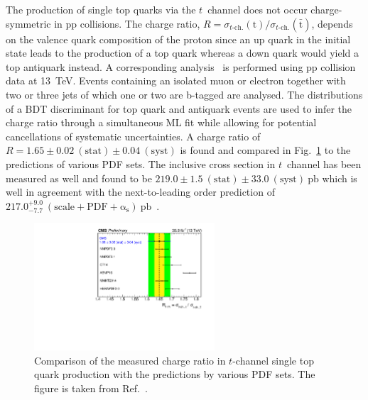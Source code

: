 \documentclass{PoS}
\begin{document}
The production of single top quarks via the $t$~channel does not occur charge-symmetric in pp collisions. The charge ratio, $R=\sigma_{t\mbox{-}\mathrm{ch.}}({\mathrm{t}})/\sigma_{t\mbox{-}\mathrm{ch.}}({\bar{\mathrm{t}}})$, depends on the valence quark composition of the proton since an up quark in the initial state leads to the production of a top quark whereas a down quark would yield a top antiquark instead. A corresponding analysis~\cite{tch} is performed using pp collision data at 13~TeV. Events containing an isolated muon or electron together with two or three jets of which one or two are b-tagged are analysed. The distributions of a BDT discriminant for top quark and antiquark events are used to infer the charge ratio through a simultaneous ML fit while allowing for potential cancellations of systematic uncertainties. A charge ratio of ${R=1.65\pm0.02~\mathrm{(stat)}\pm0.04~\mathrm{(syst)}}$ is found and compared in Fig.~\ref{fig:t-channel-ratio} to the predictions of various PDF sets. The inclusive cross section in $t$~channel has been measured as well and found to be ${219.0\pm1.5~\mathrm{(stat)}\pm33.0~\mathrm{(syst)}~\mathrm{pb}}$ which is well in agreement with the next-to-leading order prediction of ${217.0^{+9.0}_{-7.7}~\mathrm{(scale+PDF+\alpha_s)}~\mathrm{pb}}$~\cite{hathor}.
 

\begin{figure}[!htb]
\begin{center}
\includegraphics[width=0.6\textwidth]{tch3.pdf}
\caption{\label{fig:t-channel-ratio}Comparison of the measured charge ratio in $t$-channel single top quark production with the predictions by various PDF sets. The figure is taken from Ref.~\cite{tch}.}
\end{center}
\end{figure}
\end{document}
